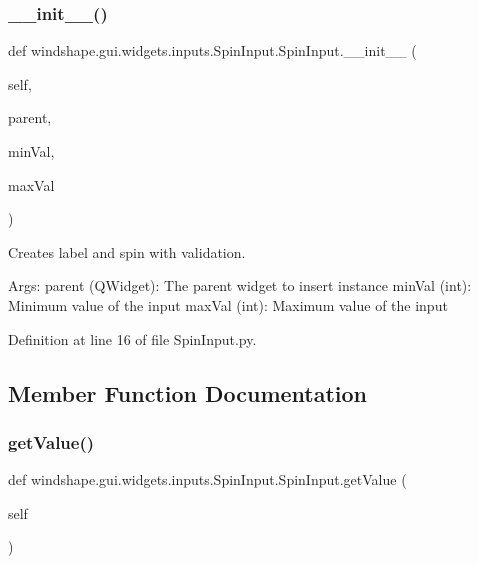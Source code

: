 \subsubsection{\texorpdfstring{\+\_\+\+\_\+init\+\_\+\+\_\+()}{\_\_init\_\_()}}
{\footnotesize\ttfamily def windshape.\+gui.\+widgets.\+inputs.\+Spin\+Input.\+Spin\+Input.\+\_\+\+\_\+init\+\_\+\+\_\+ (\begin{DoxyParamCaption}\item[{}]{self,  }\item[{}]{parent,  }\item[{}]{min\+Val,  }\item[{}]{max\+Val }\end{DoxyParamCaption})}

\begin{DoxyVerb}Creates label and spin with validation.

Args:
    parent (QWidget): The parent widget to insert instance
    minVal (int): Minimum value of the input
    maxVal (int): Maximum value of the input
\end{DoxyVerb}
 

Definition at line 16 of file Spin\+Input.\+py.



\subsection{Member Function Documentation}
\mbox{\label{classwindshape_1_1gui_1_1widgets_1_1inputs_1_1_spin_input_1_1_spin_input_a762076f3e0da3f1c584664b68fb9a838}} 
\subsubsection{\texorpdfstring{get\+Value()}{getValue()}}
{\footnotesize\ttfamily def windshape.\+gui.\+widgets.\+inputs.\+Spin\+Input.\+Spin\+Input.\+get\+Value (\begin{DoxyParamCaption}\item[{}]{self }\end{DoxyParamCaption})}

